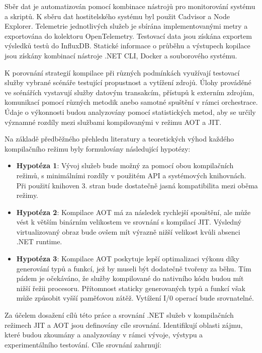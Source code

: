 Sběr dat je automatizován pomocí kombinace nástrojů pro monitorování systému a skriptů. K sběru dat hostitelského systému byl použit Cadvisor a Node Explorer. Telemetrie jednotlivých služeb je sbírána implementovanými metry a exportována do kolektoru OpenTelemetry. Testovací data jsou získána exportem výsledků testů do InfluxDB. Statické informace o průběhu a výstupech kopilace jsou získány kombinací nástroje .NET CLI, Docker a souborového systému.

K porovnání strategií kompilace při různých podmínkách využívají testovací služby vybrané scénáře testující propustnost a vytížení zdrojů. Úlohy prováděné ve scénářích vystavují služby datovým transakcím, přístupů k externím zdrojům, komunikací pomocí různých metodik anebo samotné spuštění v rámci orchestrace. Údaje o výkonnosti budou analyzovány pomocí statistických metod, aby se určily významné rozdíly mezi službami kompilovanými v režimu AOT a JIT. 


Na základě předběžného přehledu literatury a teoretických výhod každého kompilačního režimu byly formulovány následující hypotézy:

\begin{itemize}
    \item \textbf{Hypotéza 1}: Vývoj služeb bude možný za pomocí obou kompilačních režimů, s minimálními rozdíly v použitém API a systémových knihovnách. Při použití knihoven 3. stran bude dostatečně jasná kompatibilita mezi oběma režimy.
    \item \textbf{Hypotéza 2}: Kompilace AOT má za následek rychlejší spouštění, ale může vést k větším binárním velikostem ve srovnání s kompilací JIT. Výsledný virtualizovaný obraz bude ovšem mít výrazně nižší velikost kvůli absenci .NET runtime.
    \item \textbf{Hypotéza 3}: Kompilace AOT poskytuje lepší optimalizaci výkonu díky generování typů a funkcí, jež by museli být dodatečně tvořeny za běhu. Tím pádem je očekáváno, že služby kompilované do nativního kódu budou mít nižší řežii procesoru. Přítomnost staticky generovaných typů a funkcí však může způsobit vyšší paměťovou zátěž. Vytížení I/0 operací bude srovnatelné.
\end{itemize}


Za účelem dosažení cílů této práce a srovnání .NET služeb v kompilačních režimech JIT a AOT jsou definovány cíle srovnání. Identifikují oblasti zájmu, které budou zkoumány a analyzovány v rámci vývoje, výstypu a experimentálního testování. Cíle srovnání zahrnují:  

